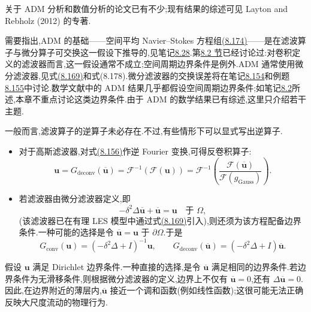 \begin{note}[数学文献]
\label{note:les-adm-mathematical-literature}
关于 ADM 分析和数值分析的论文已有不少;现有结果的综述可见 Layton and Rebholz (2012) 的专著.

需要指出,ADM 的基础——空间平均 Navier--Stokes 方程组\hyperref[eq:les-adm-filtered-ns]{(8.174)}——是在滤波算子与微分算子可交换这一假设下推导的,见笔记\hyperref[note:steps-deriving-les-models]{8.28}.第\hyperref[sec:large-eddy-space-averaging]{8.2 节}已经讨论过:对卷积定义的滤波器而言,这一假设通常不成立;空间周期边界条件是例外.ADM 通常使用微分滤波器,见式\hyperref[eq:rational-les-auxiliary-helmholtz]{(8.169)}和式(8.178).微分滤波器的交换误差将在笔记\hyperref[note:les-differential-filter-commutation]{8.154}和例题\hyperref[ex:les-differential-filter-commutation-error]{8.155}中讨论.数学文献中的 ADM 结果几乎都假设空间周期边界条件;如笔记\hyperref[note:turbulence-chapter-contents]{8.2}所述,本章不重点讨论这类边界条件.由于 ADM 的数学结果已有综述,这里只介绍若干主题.
\end{note}

\begin{example}[逆反卷积算子]
\label{ex:les-inverse-deconvolution-operators}
一般而言,滤波算子的逆算子未必存在.不过,有些情形下可以显式写出逆算子.
\begin{itemize}
 \item 对于高斯滤波器,对式\hyperref[eq:les-wave-filtered-velocity-transform]{(8.156)}作逆 Fourier 变换,可得反卷积算子:
 \[
  \bm{u}
  =G_{\mathrm{deconv}}(\overline{\bm{u}})
  =\mathcal{F}^{-1}\!\left(
    \mathcal{F}(\bm{u})\right)
  =\mathcal{F}^{-1}\!\left(
    \frac{\mathcal{F}(\overline{\bm{u}})}
         {\mathcal{F}(g_{\mathrm{Gauss}})}\right).
 \]
 \item 若滤波器由微分滤波器定义,即
 \begin{equation}\label{eq:les-adm-differential-filter}
  -\delta^2\Delta\overline{\bm{u}}
  +\overline{\bm{u}}=\bm{u}
  \quad\text{于 }\Omega,
 \end{equation}
 (该滤波器已在有理 LES 模型中通过式\hyperref[eq:rational-les-auxiliary-helmholtz]{(8.169)}引入),则还须为该方程配备边界条件.一种可能的选择是令
 $\overline{\bm{u}}=\bm{u}$ 于 $\partial\Omega$.于是
 \[
  G_{\mathrm{conv}}(\bm{u})
  =(-\delta^2\Delta+I)^{-1}\bm{u},
  \qquad
  G_{\mathrm{deconv}}(\overline{\bm{u}})
  =(-\delta^2\Delta+I)\overline{\bm{u}}.
 \]
\end{itemize}
\end{example}

\begin{note}[微分滤波器的边界条件]
\label{note:les-differential-filter-boundary-conditions}
假设 $\bm{u}$ 满足 Dirichlet 边界条件.一种直接的选择,是令 $\overline{\bm{u}}$ 满足相同的边界条件.若边界条件为无滑移条件,则根据微分滤波器的定义,边界上不仅有 $\overline{\bm{u}}=0$,还有 $\Delta\overline{\bm{u}}=0$.因此,在边界附近的薄层内,$\overline{\bm{u}}$ 接近一个调和函数(例如线性函数);这很可能无法正确反映大尺度流动的物理行为.
\end{note}

